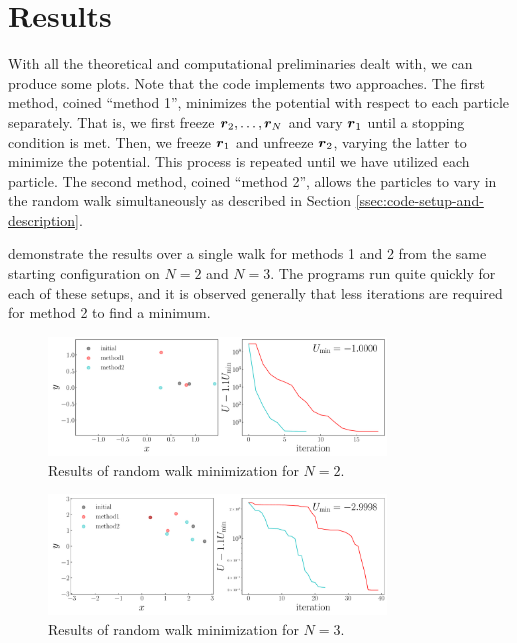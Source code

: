 \section{Results}

With all the theoretical and computational preliminaries dealt with, we can produce some plots.
Note that the code implements two approaches.
The first method, coined ``method 1'', minimizes the potential with respect to each particle separately.
That is, we first freeze $\vb*{r}_{2}, \ldots, \vb*{r}_{N}$ and vary $\vb*{r}_{1}$ until a stopping condition is met.
Then, we freeze $\vb*{r}_{1}$ and unfreeze $\vb*{r}_{2}$, varying the latter to minimize the potential.
This process is repeated until we have utilized each particle.
The second method, coined ``method 2'', allows the particles to vary in the random walk simultaneously as described in Section \ref{ssec:code-setup-and-description}.

 demonstrate the results over a single walk for methods 1 and 2 from the same starting configuration on $N = 2$ and $N = 3$.
The programs run quite quickly for each of these setups, and it is observed generally that less iterations are required for method 2 to find a minimum.

\begin{figure}[h!tb]
    \centering
    \includegraphics[width=0.8\textwidth]{track_min2.pdf}
    \caption{Results of random walk minimization for $N = 2$.}
    \label{fig:track-min2}
\end{figure}

\begin{figure}[h!tb]
    \centering
    \includegraphics[width=0.8\textwidth]{track_min3.pdf}
    \caption{Results of random walk minimization for $N =3$.}
    \label{fig:track-min3}
\end{figure}

